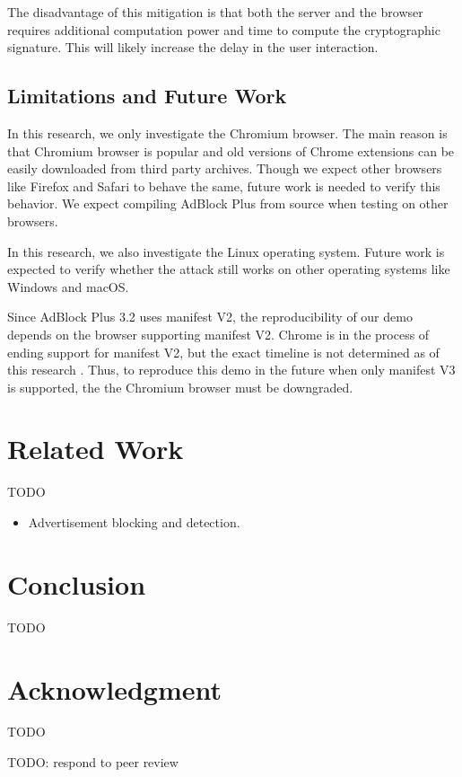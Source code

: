 \documentclass[conference]{IEEEtran}
\begin{document}
The disadvantage of this mitigation is that both the server and the browser requires additional computation power and time to compute the cryptographic signature. This will likely increase the delay in the user interaction.

\subsection{Limitations and Future Work}

In this research, we only investigate the Chromium browser. The main reason is that Chromium browser is popular and old versions of Chrome extensions can be easily downloaded from third party archives. Though we expect other browsers like Firefox and Safari to behave the same, future work is needed to verify this behavior. We expect compiling AdBlock Plus from source when testing on other browsers.

In this research, we also investigate the Linux operating system. Future work is expected to verify whether the attack still works on other operating systems like Windows and macOS.

Since AdBlock Plus 3.2 uses manifest V2, the reproducibility of our demo depends on the browser supporting manifest V2. Chrome is in the process of ending support for manifest V2, but the exact timeline is not determined as of this research \cite{chrome_manifest_v2}. Thus, to reproduce this demo in the future when only manifest V3 is supported, the the Chromium browser must be downgraded.

\section{Related Work}
TODO
\begin{itemize}
\item Advertisement blocking and detection.
\end{itemize}

\section{Conclusion}
TODO

\section*{Acknowledgment}
TODO




\appendix
TODO: respond to peer review
\end{document}
